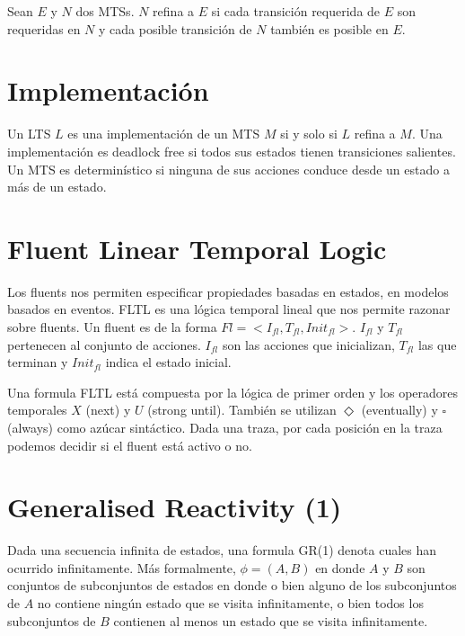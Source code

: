 \vspace{\baselineskip}
Sean $E$ y $N$ dos MTSs. $N$ refina a $E$ si cada transición requerida de $E$ son requeridas en $N$ y cada posible
transición de $N$ también es posible en $E$.

\section{Implementación}

Un LTS $L$ es una implementación de un MTS $M$ si y solo si $L$ refina a $M$. Una implementación es deadlock free
si todos sus estados tienen transiciones salientes. Un MTS es determinístico si ninguna de sus acciones conduce
desde un estado a más de un estado.

\section{Fluent Linear Temporal Logic}
Los fluents nos permiten especificar propiedades basadas en estados, en modelos basados en eventos. FLTL es una
lógica temporal lineal que nos permite razonar sobre fluents. Un fluent es de la forma $Fl = <I_{fl}, T_{fl}, Init_{fl}>$.
$I_{fl}$ y $T_{fl}$ pertenecen al conjunto de acciones. $I_{fl}$ son las acciones que inicializan, $T_{fl}$ las que
terminan y $Init_{fl}$ indica el estado inicial.

\vspace{\baselineskip}
Una formula FLTL está compuesta por la lógica de primer orden y los operadores temporales $X$ (next) y $U$ (strong until).
También se utilizan $\Diamond$ (eventually) y $\square$ (always) como azúcar sintáctico.
Dada una traza, por cada posición en la traza podemos decidir si el fluent está activo o no.

\vspace{\baselineskip}


\section{Generalised Reactivity (1)}

Dada una secuencia infinita de estados, una formula GR(1) denota cuales han ocurrido infinitamente. 
Más formalmente, $\phi = (A, B)$ en donde $A$ y $B$ son conjuntos de subconjuntos de estados en donde o bien alguno de los
subconjuntos de $A$ no contiene ningún estado que se visita infinitamente, o bien todos los subconjuntos de $B$ contienen 
al menos un estado que se visita infinitamente.

